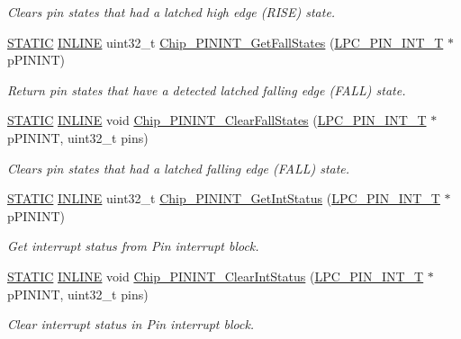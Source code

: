 \begin{DoxyCompactItemize}
\begin{DoxyCompactList}\small\item\em Clears pin states that had a latched high edge (R\+I\+SE) state. \end{DoxyCompactList}\item 
\hyperlink{group___l_p_c___types___public___macros_ga10b2d890d871e1489bb02b7e70d9bdfb}{S\+T\+A\+T\+IC} \hyperlink{spifi__18xx__43xx_8h_a2eb6f9e0395b47b8d5e3eeae4fe0c116}{I\+N\+L\+I\+NE} uint32\+\_\+t \hyperlink{group___p_i_n_i_n_t__18_x_x__43_x_x_ga71d71a0537b91ed76457a8f65165c4ec}{Chip\+\_\+\+P\+I\+N\+I\+N\+T\+\_\+\+Get\+Fall\+States} (\hyperlink{struct_l_p_c___p_i_n___i_n_t___t}{L\+P\+C\+\_\+\+P\+I\+N\+\_\+\+I\+N\+T\+\_\+T} $\ast$p\+P\+I\+N\+I\+NT)
\begin{DoxyCompactList}\small\item\em Return pin states that have a detected latched falling edge (F\+A\+LL) state. \end{DoxyCompactList}\item 
\hyperlink{group___l_p_c___types___public___macros_ga10b2d890d871e1489bb02b7e70d9bdfb}{S\+T\+A\+T\+IC} \hyperlink{spifi__18xx__43xx_8h_a2eb6f9e0395b47b8d5e3eeae4fe0c116}{I\+N\+L\+I\+NE} void \hyperlink{group___p_i_n_i_n_t__18_x_x__43_x_x_ga1290614d9a1761b3e926b3de79a4ca23}{Chip\+\_\+\+P\+I\+N\+I\+N\+T\+\_\+\+Clear\+Fall\+States} (\hyperlink{struct_l_p_c___p_i_n___i_n_t___t}{L\+P\+C\+\_\+\+P\+I\+N\+\_\+\+I\+N\+T\+\_\+T} $\ast$p\+P\+I\+N\+I\+NT, uint32\+\_\+t pins)
\begin{DoxyCompactList}\small\item\em Clears pin states that had a latched falling edge (F\+A\+LL) state. \end{DoxyCompactList}\item 
\hyperlink{group___l_p_c___types___public___macros_ga10b2d890d871e1489bb02b7e70d9bdfb}{S\+T\+A\+T\+IC} \hyperlink{spifi__18xx__43xx_8h_a2eb6f9e0395b47b8d5e3eeae4fe0c116}{I\+N\+L\+I\+NE} uint32\+\_\+t \hyperlink{group___p_i_n_i_n_t__18_x_x__43_x_x_ga0c5e739048c5033c2d4020520100856c}{Chip\+\_\+\+P\+I\+N\+I\+N\+T\+\_\+\+Get\+Int\+Status} (\hyperlink{struct_l_p_c___p_i_n___i_n_t___t}{L\+P\+C\+\_\+\+P\+I\+N\+\_\+\+I\+N\+T\+\_\+T} $\ast$p\+P\+I\+N\+I\+NT)
\begin{DoxyCompactList}\small\item\em Get interrupt status from Pin interrupt block. \end{DoxyCompactList}\item 
\hyperlink{group___l_p_c___types___public___macros_ga10b2d890d871e1489bb02b7e70d9bdfb}{S\+T\+A\+T\+IC} \hyperlink{spifi__18xx__43xx_8h_a2eb6f9e0395b47b8d5e3eeae4fe0c116}{I\+N\+L\+I\+NE} void \hyperlink{group___p_i_n_i_n_t__18_x_x__43_x_x_ga0a1d6ec4462429278d065017109c8634}{Chip\+\_\+\+P\+I\+N\+I\+N\+T\+\_\+\+Clear\+Int\+Status} (\hyperlink{struct_l_p_c___p_i_n___i_n_t___t}{L\+P\+C\+\_\+\+P\+I\+N\+\_\+\+I\+N\+T\+\_\+T} $\ast$p\+P\+I\+N\+I\+NT, uint32\+\_\+t pins)
\begin{DoxyCompactList}\small\item\em Clear interrupt status in Pin interrupt block. \end{DoxyCompactList}\end{DoxyCompactItemize}


